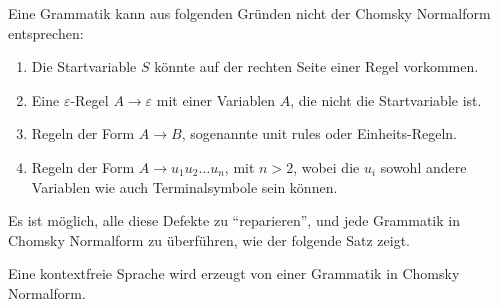 Eine Grammatik kann aus folgenden Gründen nicht der Chomsky Normalform
entsprechen:
\begin{enumerate}
\item Die Startvariable $S$ könnte auf der rechten Seite einer
Regel vorkommen.
\item Eine $\varepsilon$-Regel $A\to\varepsilon$ mit einer Variablen
$A$, die nicht die Startvariable ist.
%
%
\item Regeln der Form $A\to B$, sogenannte unit rules oder Einheits-Regeln.
\item Regeln der Form $A\to u_1u_2\dots u_n$, mit $n>2$, wobei
die $u_i$ sowohl andere Variablen wie auch Terminalsymbole sein 
können.
\end{enumerate}
Es ist möglich, alle diese Defekte zu ``reparieren'', und jede
Grammatik in Chomsky Normalform zu überführen, wie der folgende Satz
zeigt.

\begin{satz}
\label{satz:cnf}
Eine kontextfreie Sprache wird erzeugt von einer Grammatik
in Chomsky Normalform.
\end{satz}

